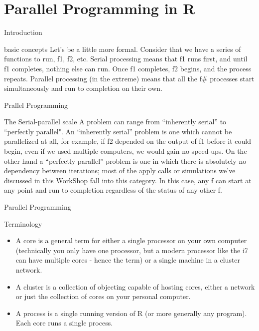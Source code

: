 \documentclass{beamer}\usepackage[]{graphicx}\usepackage[]{xcolor}
\begin{document}


\section{Parallel Programming in R}
\begin{frame}{Introduction}
\begin{block}{basic concepts}
Let’s be a little more formal.
Consider that we have a series of functions to run, f1, f2, etc.
Serial processing means that f1 runs first, and until f1 completes, nothing else can run. Once f1 completes, f2 begins, and the process repeats.
Parallel processing (in the extreme) means that all the f$\#$ processes start simultaneously and run to completion on their own.
    \end{block}
\end{frame}


\begin{frame}{Prallel Programming}
\begin{block}{The Serial-parallel scale}
A problem can range from “inherently serial” to “perfectly parallel".
An “inherently serial” problem is one which cannot be parallelized at all, 
for example, if f2 depended on the output of f1 before it could begin, 
even if we used multiple computers, we would gain no speed-ups.
On the other hand a “perfectly parallel” problem is one in which 
there is absolutely no dependency between iterations; most of the 
apply calls or simulations we’ve discussed in this WorkShop fall into this category. In this case, 
any f can start at any point and run to completion regardless of the status of any other f.
\end{block}
\end{frame}


\begin{frame}{Parallel Programming}
\begin{block}{Terminology}
\begin{itemize}
    \item A core is a general term for either a single processor on your own computer (technically you only have one processor, but a modern processor like the i7 can have multiple cores - hence the term) or a single machine in a cluster network.
    \item  A cluster is a collection of objecting capable of hosting cores, either a network or just the collection of cores on your personal computer.
    \item A process is a single running version of R (or more generally any program). Each core runs a single process.
\end{itemize}  
\end{block}  
\end{frame}
\end{document}
